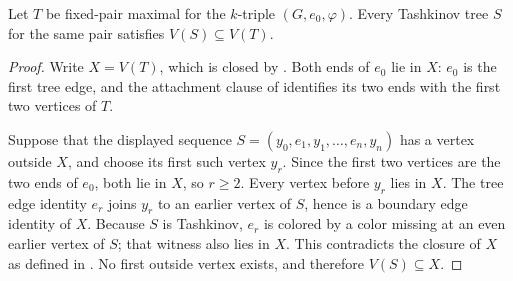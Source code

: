 \begin{lemma}
Let $T$ be fixed-pair maximal for the $k$-triple
$(G,e_0,\varphi)$.  Every Tashkinov tree $S$ for the same pair satisfies
$V(S)\subseteq V(T)$.
\end{lemma}
\begin{proof}
Write $X=V(T)$, which is closed by
.  Both ends of $e_0$ lie in $X$:
$e_0$ is the first tree edge, and the attachment clause of
 identifies its two ends with the first two vertices
of $T$.

Suppose that the displayed sequence
$S=(y_0,e_1,y_1,\ldots,e_n,y_n)$ has a vertex outside $X$, and choose its
first such vertex $y_r$.  Since the first two vertices are the two ends of
$e_0$, both lie in $X$, so $r\geq2$.  Every vertex before $y_r$ lies in
$X$.  The tree edge identity $e_r$ joins $y_r$ to an earlier vertex of
$S$, hence is a boundary edge identity of $X$.  Because $S$ is Tashkinov,
$e_r$ is colored by a color missing at an even earlier vertex of $S$; that
witness also lies in $X$.  This contradicts the closure of $X$ as defined
in .  No first outside vertex exists, and
therefore $V(S)\subseteq X$.
\end{proof}

